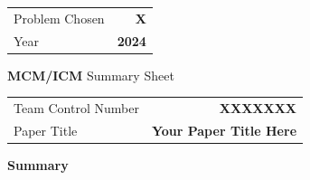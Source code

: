 \documentclass[12pt]{article}
\begin{document}
\thispagestyle{plain}

\begin{center}
    \large
    \begin{tabular}{l r}
        Problem Chosen     & \textbf{X} \\
        Year               & \textbf{2024} \\
    \end{tabular}
\end{center}

\vspace{0.5cm}

\begin{center}
    {\Large \bfseries MCM/ICM}
    \vspace{0.3cm}
    {\large Summary Sheet}
    \vspace{0.3cm}
    \begin{tabular}{l r}
        Team Control Number & \textbf{XXXXXXX} \\
        Paper Title         & \textbf{Your Paper Title Here} \\
    \end{tabular}
\end{center}

\vspace{0.5cm}

\noindent
\begin{center}
    \large\bfseries Summary
\end{center}
\end{document}
